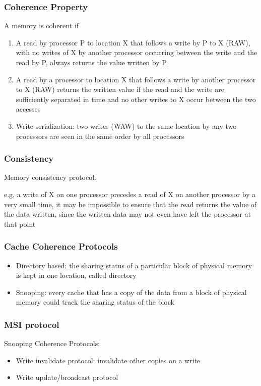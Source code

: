 \subsubsection{Coherence Property}
A memory is coherent if
\begin{enumerate}
    \item A read by processor P to location X that
    follows a write by P to X (RAW), with no writes
    of X by another processor occurring
    between the write and the read by P,
    always returns the value written by P.
    \item A read by a processor to location X that
    follows a write by another processor to
    X (RAW) returns the written value if the read
    and the write are sufficiently separated
    in time and no other writes to X occur
    between the two accesses
    \item Write serialization:
    two writes (WAW) to the same location by any
    two processors are seen in the same
    order by all processors
\end{enumerate}

\subsubsection{Consistency} 
Memory consistency protocol. 

e.g, a write of X on one processor
precedes a read of X on another
processor by a very small time, it may
be impossible to ensure that the read
returns the value of the data written,
since the written data may not even
have left the processor at that point

\subsubsection{Cache Coherence Protocols}
\begin{itemize}
    \item Directory based: the sharing status of a particular block
    of physical memory is kept in one
    location, called directory
    \item Snooping: every cache that has a copy of the data
    from a block of physical memory could
    track the sharing status of the block
\end{itemize}


\subsubsection{MSI protocol}
Snooping Coherence Protocols: 
\begin{itemize}
    \item Write invalidate protocol: invalidate other copies on a write
    \item Write update/broadcast protocol
\end{itemize}

